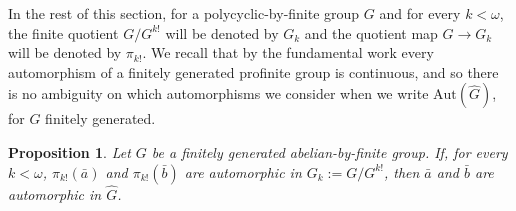 \documentclass[a4paper, 11pt]{amsart}
\newtheorem{prop}[te]{Proposition}
\theoremstyle{definition}
\theoremstyle{remark}
\begin{document}
In the rest of this section, for a polycyclic-by-finite group $G$ and for every $k < \omega$, the finite quotient $G/G^{k!}$ will be denoted by $G_k$ and the quotient map $G \rightarrow G_k$ will be denoted by $\pi_{k!}$.
%
We recall that by the fundamental work \cite{segal_annals} every automorphism of a finitely generated profinite group is continuous, and so there is no ambiguity on which automorphisms we consider when we write $\mathrm{Aut}(\widehat{G})$, for $G$ finitely generated.

\begin{prop}\label{the_continous_auto_prop}Let $G$ be a finitely generated abelian-by-finite group. If, for every $k < \omega$, $\pi_{k!}(\bar{a})$ and $\pi_{k!}(\bar{b})$ are automorphic in $G_k := G/G^{k!}$, then $\bar{a}$ and $\bar{b}$ are automorphic in $\widehat{G}$.
\end{prop}
\end{document}

